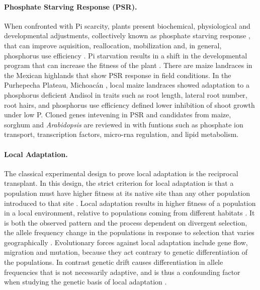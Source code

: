 \documentclass[10pt,letterpaper]{article}
\begin{document}
\paragraph{Phosphate Starving Response (PSR).} 
When confronted with Pi scarcity, plants present biochemical, physiological and developmental adjustments, collectively known as phosphate starving response , that can improve aquisition, reallocation, mobilization and, in general, phosphorus use efficiency \cite{scheible2015}. Pi starvation results in a shift in the developmental program that can increase the fitness of the plant \cite{peret2011}. There are maize landraces in the Mexican highlands that show PSR response in field conditions. In the Purhepecha Plateau, Michoacán \cite{bayuelo-jimenez2011,bayuelo-jimenez2014}, local maize landraces showed adaptation to a phosphorus deficient Andisol in traits such as root length, lateral root number, root hairs, and phosphorus use efficiency defined lower inhibition of shoot growth under low P. Cloned genes intevening in PSR and candidates from maize, sorghum and \textit{Arabidopsis} are reviewed in \cite{calderon-vazquez2011} with funtions such as phosphate ion transport, transcription factors, micro-rna regulation, and lipid metabolism.

\paragraph{Local Adaptation.} 
The classical experimental design to prove local adaptation is the reciprocal transplant. In this design, the strict criterion for local adaptation is that a population must have higher fitness at its native site than any other population introduced to that site \cite{savolainen2013}. Local adaptation results in higher fitness  of a population in a local environment, relative to populations coming from different habitats \cite{kawecki2004}. It is both the observed pattern and the process dependent on divergent selection, the allele frequency change in the populations in response to selection that varies geographically \cite{tiffin2014}. Evolutionary forces against local adaptation include gene flow, migration and  mutation, because  they act contrary to genetic differentiation of the populations. In contrast genetic drift causes differentiation in allele frequencies that is not necessarily adaptive, and is thus a confounding factor when studying the genetic basis of local adaptation \cite{kawecki2004}. 
\end{document}
